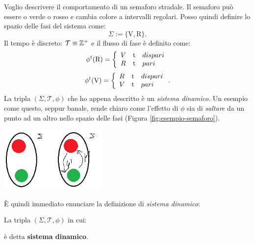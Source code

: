 \begin{example}[Semaforo]
    \label{ex:semaforo}
    Voglio descrivere il comportamento di un semaforo stradale.
    Il semaforo può essere o verde o rosso e cambia colore a intervalli regolari.
    Posso quindi definire lo spazio delle fasi del sistema come:
    \begin{equation*}
        \Sigma := \{\text{V}, \text{R} \}.
    \end{equation*}
    Il tempo è discreto: $\mathcal T \equiv \mathbb{Z}^+$ e il flusso di fase è definito come:
    \begin{equation*}
         \phi^t(\text R) = \left\{
         \begin{array}{lrl}
             V &$t$ &dispari\\
             R &$t$ &pari
         \end{array}
         \right.
    \end{equation*}
    \begin{equation*}
        \phi^t(\text V) = \left\{
        \begin{array}{lrl}
            R &$t$ &dispari\\
            V &$t$ &pari
        \end{array}
        \right.
        .
    \end{equation*}
    La tripla $(\Sigma, \mathcal T, \phi)$ che ho appena descritto è un \emph{sistema dinamico}.
    Un esempio come questo, seppur banale, rende chiaro come l'effetto di $\phi$ sia
    di \emph{saltare} da un punto ad un altro nello spazio delle fasi (Figura \ref{fig:esempio-semaforo}).

    \begin{center}
        \includegraphics[width=0.4\textwidth]{assets/ex-semaforo.png}
        \label{fig:esempio-semaforo}
    \end{center}
\end{example}

È quindi immediato enunciare la definizione di \emph{sistema dinamico}:

\begin{definition}
    La tripla $(\Sigma, \mathcal T, \phi)$ in cui:
    \begin{itemize}
    \end{itemize}
    è detta \textbf{sistema dinamico}.
\end{definition}

